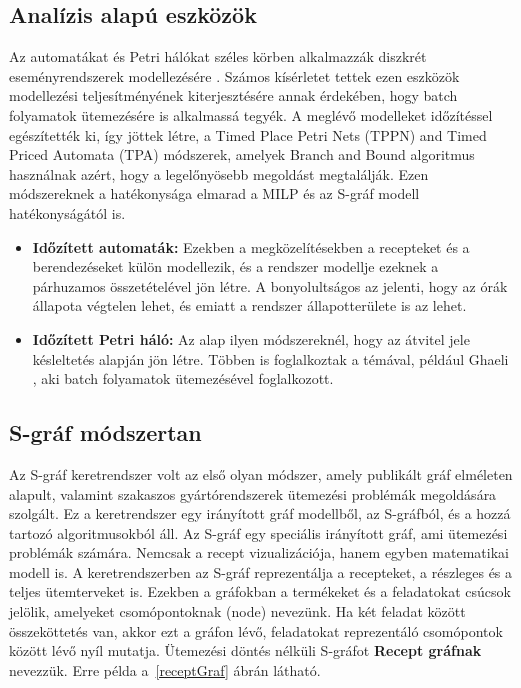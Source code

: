 \subsection{Analízis alapú eszközök}
Az automatákat és Petri hálókat széles körben alkalmazzák diszkrét eseményrendszerek modellezésére \cite{cassandras}. Számos kísérletet tettek ezen eszközök modellezési teljesítményének kiterjesztésére annak érdekében, hogy batch folyamatok ütemezésére is alkalmassá tegyék. A meglévő modelleket időzítéssel egészítették ki, így jöttek létre, a Timed Place Petri Nets (TPPN) and Timed Priced Automata (TPA) módszerek, amelyek Branch and Bound algoritmus használnak azért, hogy a legelőnyösebb megoldást megtalálják. Ezen módszereknek a hatékonysága elmarad a MILP és az S-gráf modell hatékonyságától is.
\begin{itemize}
	\item[] \textbf{Időzített automaták:} Ezekben a megközelítésekben a recepteket és a berendezéseket külön modellezik, és a rendszer modellje ezeknek a párhuzamos összetételével jön létre. A bonyolultságos az jelenti, hogy az órák állapota végtelen lehet, és emiatt a rendszer állapotterülete is az lehet.
	\item[] \textbf{Időzített Petri háló:} Az alap ilyen módszereknél, hogy az átvitel jele késleltetés alapján jön létre. Többen is foglalkoztak a témával, például Ghaeli \cite{ghaeli}, aki batch folyamatok ütemezésével foglalkozott.
\end{itemize}

\subsection{S-gráf módszertan}
Az S-gráf keretrendszer volt az első olyan módszer, amely publikált gráf elméleten alapult, valamint szakaszos gyártórendszerek ütemezési problémák megoldására szolgált.\cite{combtech} Ez a keretrendszer egy irányított gráf modellből, az S-gráfból, és a hozzá tartozó algoritmusokból áll. \cite{combframe} Az S-gráf egy speciális irányított gráf, ami ütemezési problémák számára. Nemcsak a recept vizualizációja, hanem egyben matematikai modell is. A keretrendszerben az S-gráf reprezentálja a recepteket, a részleges és a teljes ütemterveket is. Ezekben a gráfokban a termékeket és a feladatokat csúcsok jelölik, amelyeket csomópontoknak (node) nevezünk. Ha két feladat között összeköttetés van, akkor ezt a gráfon lévő, feladatokat reprezentáló csomópontok között lévő nyíl mutatja. Ütemezési döntés nélküli S-gráfot \textbf{Recept gráfnak} nevezzük. Erre példa a~\ref{receptGraf} ábrán\cite{Hegyhati} látható. 

